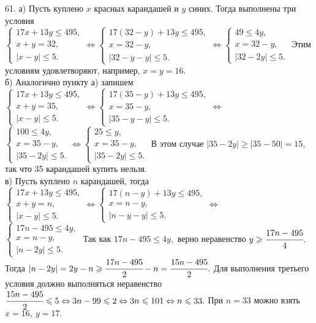 61. а) Пусть куплено $x$ красных карандашей и $y$ синих. Тогда выполнены три условия\\ $\begin{cases}17x+13y\leqslant495,\\ x+y=32,\\ |x-y|\leqslant5.\end{cases}
\Leftrightarrow \begin{cases}17(32-y)+13y\leqslant495,\\ x=32-y,\\ |32-y-y|\leqslant5.\end{cases}
\Leftrightarrow \begin{cases}49\leqslant4y,\\ x=32-y,\\ |32-2y|\leqslant5.\end{cases}$
Этим условиям удовлетворяют, например, $x=y=16.$\\
б) Аналогично пункту а) запишем $\begin{cases}17x+13y\leqslant495,\\ x+y=35,\\ |x-y|\leqslant5.\end{cases}
\Leftrightarrow \begin{cases}17(35-y)+13y\leqslant495,\\ x=35-y,\\ |35-y-y|\leqslant5.\end{cases}
\Leftrightarrow$\\$ \begin{cases}100\leqslant4y,\\ x=35-y,\\ |35-2y|\leqslant5.\end{cases}
\Leftrightarrow \begin{cases}25\leqslant y,\\ x=35-y,\\ |35-2y|\leqslant5.\end{cases}$
В этом случае $|35-2y|\geqslant|35-50|=15,$ так что 35 карандашей купить нельзя.\\
в) Пусть куплено $n$ карандашей, тогда $\begin{cases}17x+13y\leqslant495,\\ x+y=n,\\ |x-y|\leqslant5.\end{cases}
\Leftrightarrow \begin{cases}17(n-y)+13y\leqslant495,\\ x=n-y,\\ |n-y-y|\leqslant5.\end{cases}
\Leftrightarrow$\\$ \begin{cases}17n-495\leqslant4y,\\ x=n-y,\\ |n-2y|\leqslant5.\end{cases}$
Так как $17n-495\leqslant4y,$ верно неравенство $y\geqslant \cfrac{17n-495}{4}.$ Тогда $|n-2y|=2y-n\geqslant \cfrac{17n-495}{2}-n=\cfrac{15n-495}{2}.$ Для выполнения третьего условия должно выполняться неравенство $\cfrac{15n-495}{2} \leqslant 5 \Leftrightarrow3n-99\leqslant 2\Leftrightarrow 3n\leqslant 101
\Leftrightarrow n\leqslant 33.$ При $n=33$ можно взять $x=16,\ y=17.$\\
